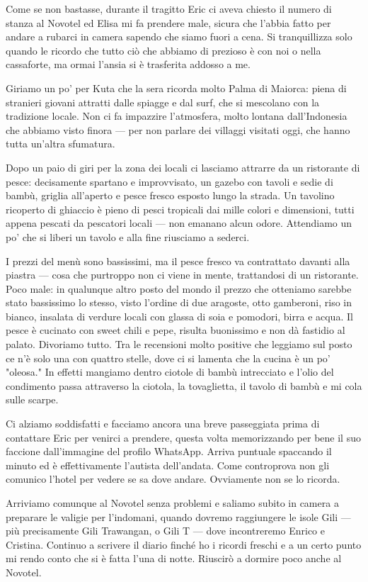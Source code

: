 Come se non bastasse, durante il tragitto Eric ci aveva chiesto il numero di stanza al Novotel ed Elisa mi fa prendere male, sicura che l'abbia fatto per andare a rubarci in camera sapendo che siamo fuori a cena. Si tranquillizza solo quando le ricordo che tutto ciò che abbiamo di prezioso è con noi o nella cassaforte, ma ormai l'ansia si è trasferita addosso a me.

Giriamo un po' per Kuta che la sera ricorda molto Palma di Maiorca: piena di stranieri giovani attratti dalle spiagge e dal surf, che si mescolano con la tradizione locale. Non ci fa impazzire l'atmosfera, molto lontana dall'Indonesia che abbiamo visto finora — per non parlare dei villaggi visitati oggi, che hanno tutta un'altra sfumatura.

Dopo un paio di giri per la zona dei locali ci lasciamo attrarre da un ristorante di pesce: decisamente spartano e improvvisato, un gazebo con tavoli e sedie di bambù, griglia all'aperto e pesce fresco esposto lungo la strada. Un tavolino ricoperto di ghiaccio è pieno di pesci tropicali dai mille colori e dimensioni, tutti appena pescati da pescatori locali — non emanano alcun odore. Attendiamo un po' che si liberi un tavolo e alla fine riusciamo a sederci.

I prezzi del menù sono bassissimi, ma il pesce fresco va contrattato davanti alla piastra — cosa che purtroppo non ci viene in mente, trattandosi di un ristorante. Poco male: in qualunque altro posto del mondo il prezzo che otteniamo sarebbe stato bassissimo lo stesso, visto l'ordine di due aragoste, otto gamberoni, riso in bianco, insalata di verdure locali con glassa di soia e pomodori, birra e acqua. Il pesce è cucinato con sweet chili e pepe, risulta buonissimo e non dà fastidio al palato. Divoriamo tutto. Tra le recensioni molto positive che leggiamo sul posto ce n'è solo una con quattro stelle, dove ci si lamenta che la cucina è un po' "oleosa." In effetti mangiamo dentro ciotole di bambù intrecciato e l'olio del condimento passa attraverso la ciotola, la tovaglietta, il tavolo di bambù e mi cola sulle scarpe.

Ci alziamo soddisfatti e facciamo ancora una breve passeggiata prima di contattare Eric per venirci a prendere, questa volta memorizzando per bene il suo faccione dall'immagine del profilo WhatsApp. Arriva puntuale spaccando il minuto ed è effettivamente l'autista dell'andata. Come controprova non gli comunico l'hotel per vedere se sa dove andare. Ovviamente non se lo ricorda.

Arriviamo comunque al Novotel senza problemi e saliamo subito in camera a preparare le valigie per l'indomani, quando dovremo raggiungere le isole Gili — più precisamente Gili Trawangan, o Gili T — dove incontreremo Enrico e Cristina. Continuo a scrivere il diario finché ho i ricordi freschi e a un certo punto mi rendo conto che si è fatta l'una di notte. Riuscirò a dormire poco anche al Novotel.

